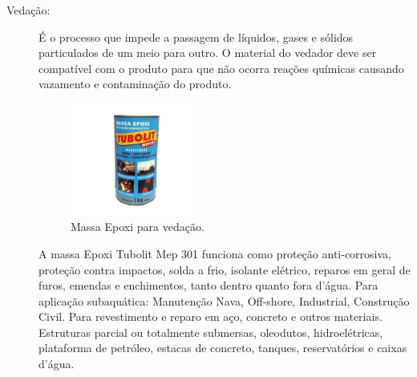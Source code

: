 \begin{description}
\item[Vedação:] É o processo que impede a passagem de líquidos, gases e
sólidos particulados de um meio para outro. O material do vedador deve ser
compatível com o produto para que não ocorra reações químicas causando vazamento
e contaminação do produto.
\par
\begin{figure}[h]
  \centering
  \includegraphics[width=0.4\textwidth]{figures/haha.png}
  \caption{Massa Epoxi para vedação.}
  \label{fig:haha}
\end{figure}
\FloatBarrier
\par
A massa Epoxi Tubolit Mep 301 funciona como proteção anti-corrosiva, proteção
contra impactos, solda a frio, isolante elétrico, reparos em geral de furos,
emendas e enchimentos, tanto dentro quanto fora d’água. Para aplicação
subaquática: Manutenção Nava, Off-shore, Industrial, Construção Civil. Para
revestimento e reparo em aço, concreto e outros materiais. Estruturas parcial
ou totalmente submersas, oleodutos, hidroelétricas, plataforma de petróleo,
estacas de concreto, tanques, reservatórios e caixas d'água.
\end{description}

